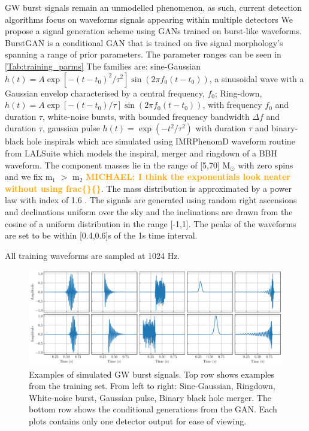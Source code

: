 \documentclass[12pt]{iopart}
\newcommand{\michael}[1]{\textbf{\textcolor{orange}{MICHAEL: #1}}}
\begin{document}
GW burst signals remain an unmodelled phenomenon, as such, current
detection algorithms focus on waveforms signals appearing within multiple detectors We propose a
signal generation scheme using \acp{GAN} trained on burst-like
waveforms. BurstGAN is a conditional GAN that is trained on five signal morphology's spanning a range of prior
parameters. The parameter ranges can be seen in \cref{Tab:training_parms} The families are: sine-Gaussian $h(t) = A \exp\left[ - (t-t_{0})^2 / \tau^2 \right] \sin (2 \pi f_0 (t-t_0))$, a sinusoidal wave with a Gaussian envelop characterised by a central frequency, $f_0$; Ring-down, $h(t) = A \exp \left[-{(t-t_0)} / {\tau} \right] \sin(2 \pi f_0 (t-t_0))$, with frequency $f_0$ and duration $\tau$, white-noise bursts, with bounded frequency bandwidth $\Delta f$ and duration $\tau$, gaussian pulse $h(t) = \exp(-t^2 / \tau^2)$ with duration $\tau$ and binary-black hole inspirals which are simulated using IMRPhenomD waveform \cite{Khan_2016} routine from
LALSuite \cite{lalsuite} which models the
inspiral, merger and ringdown of a \ac{BBH} waveform. The component masses lie
in the range of [5,70] $\textrm{M}_{\odot}$ with zero spins
and we fix m$_1$ $>$ m$_2$ \michael{I think the exponentials look neater without using frac\{\}\{\}}. The mass distribution is approximated by a power
law with index of 1.6 \cite{Abbott_2019}. The signals are generated using random right ascensions and
declinations uniform over the sky and the inclinations are drawn from the
cosine of a uniform distribution in the range [-1,1]. The peaks of the
waveforms are set to be within [0.4,0.6]s of the 1s time interval.

All training waveforms are sampled at 1024 Hz.

\begin{figure}
    \centering
    \includegraphics[width=\textwidth]{figures/train_gen.pdf}
    \caption{Examples of simulated \ac{GW} burst signals. Top row shows
examples from the training set. From left to right: Sine-Gaussian, Ringdown,
White-noise burst, Gaussian pulse, Binary black hole merger. The bottom row
shows the conditional generations from the GAN. Each plots contains only one detector output for ease of viewing.}
\label{fig:train} \end{figure}
\end{document}
